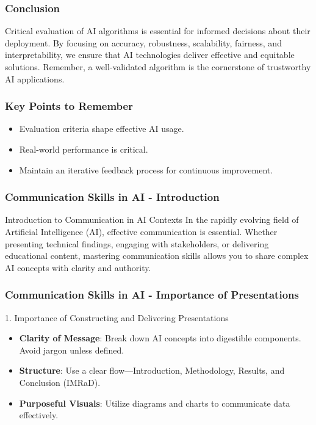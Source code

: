 \documentclass[aspectratio=169]{beamer}
\begin{document}
\begin{frame}[fragile]
    \frametitle{Conclusion}
    Critical evaluation of AI algorithms is essential for informed decisions about their deployment. 
    By focusing on accuracy, robustness, scalability, fairness, and interpretability, we ensure that AI technologies deliver effective and equitable solutions. 
    Remember, a well-validated algorithm is the cornerstone of trustworthy AI applications.
\end{frame}

\begin{frame}[fragile]
    \frametitle{Key Points to Remember}
    \begin{itemize}
        \item Evaluation criteria shape effective AI usage.
        \item Real-world performance is critical. 
        \item Maintain an iterative feedback process for continuous improvement.
    \end{itemize}
\end{frame}

\begin{frame}[fragile]
    \frametitle{Communication Skills in AI - Introduction}
    \begin{block}{Introduction to Communication in AI Contexts}
        In the rapidly evolving field of Artificial Intelligence (AI), effective communication is essential. Whether presenting technical findings, engaging with stakeholders, or delivering educational content, mastering communication skills allows you to share complex AI concepts with clarity and authority.
    \end{block}
\end{frame}

\begin{frame}[fragile]
    \frametitle{Communication Skills in AI - Importance of Presentations}
    \begin{block}{1. Importance of Constructing and Delivering Presentations}
        \begin{itemize}
            \item \textbf{Clarity of Message}: Break down AI concepts into digestible components. Avoid jargon unless defined.
            \item \textbf{Structure}: Use a clear flow—Introduction, Methodology, Results, and Conclusion (IMRaD).
            \item \textbf{Purposeful Visuals}: Utilize diagrams and charts to communicate data effectively.
        \end{itemize}
    \end{block}
\end{frame}
\end{document}
